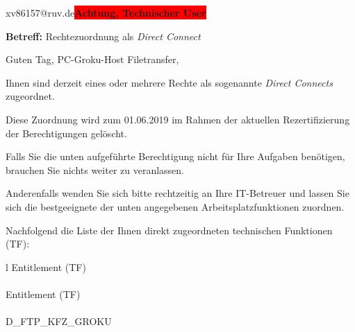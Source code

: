\documentclass[a4paper,landscape,12pt]{letter}
\begin{document}
\begin{letter}{xv86157@ruv.de\space\space\space\space\space\space\space\space\space\bfseries\colorbox{red}{Achtung, Technischer User}\hfill \break}
\begin{normalsize}
	\opening{\textbf{Betreff:} Rechtezuordnung als \emph{Direct Connect}}
	\begin{normalsize} \hfill
	\end{normalsize}

	\begin{normalsize}
		Guten Tag, 
	PC-Groku-Host Filetransfer, \hfill \break
	\end{normalsize}
	\end{normalsize}
	
\begin{normalsize}
	Ihnen sind derzeit eines oder mehrere Rechte als sogenannte \emph{Direct Connects} zugeordnet.
	
	Diese Zuordnung wird zum 01.06.2019 im Rahmen der aktuellen Rezertifizierung der Berechtigungen gelöscht.
	
	Falls Sie die unten aufgeführte Berechtigung nicht für Ihre Aufgaben benötigen, 
	brauchen Sie nichts weiter zu veranlassen.
	
	Anderenfalls wenden Sie sich bitte rechtzeitig an Ihre IT-Betreuer 
	und lassen Sie sich die bestgeeignete der unten angegebenen Arbeitsplatzfunktionen zuordnen.
	\end{normalsize}
	
\begin{normalsize}
	Nachfolgend die Liste der Ihnen direkt zugeordneten technischen Funktionen (TF):

	\begin{longtable}{l}
		Entitlement (TF) \\ \hline
		\endfirsthead
		\\\hline
		Entitlement (TF) \\ \hline
		\endhead %
		\multicolumn{1}{r@{}}{Fortsetzung \ldots}\\
		\endfoot
		\hline
		\endlastfoot
	D\_FTP\_KFZ\_GROKU\\
	\end{longtable}
	\end{normalsize}
	

\end{letter}
\end{document}
